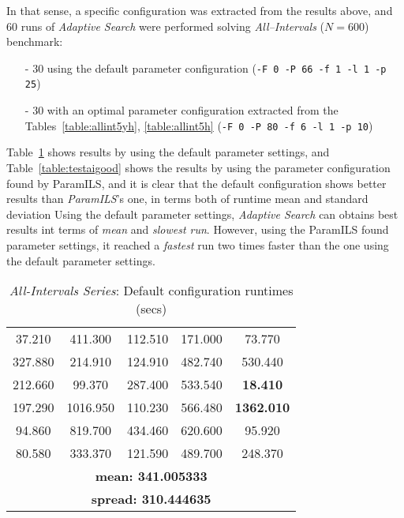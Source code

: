 In that sense, a specific configuration was extracted from the results above, and 60 runs of {\it Adaptive Search} were performed solving {\it All--Intervals} ($N = 600$) benchmark:
\begin{itemize}
	\item[-] 30 using the default parameter configuration (\texttt{-F 0 -P 66 -f 1 -l 1 -p 25})
	\item[-] 30 with an optimal parameter configuration extracted from the Tables~\ref{table:allint5yh}, \ref{table:allint5h} (\texttt{-F 0 -P 80 -f 6 -l 1 -p 10})
\end{itemize}

Table~\ref{table:testaibad} shows results by using the default parameter settings, and Table~\ref{table:testaigood} shows the results by using the parameter configuration found by {\sc ParamILS}, and it is clear that the default configuration shows better results than {\it ParamILS}'s one, in terms both of runtime mean and standard deviation Using the default parameter settings, {\it Adaptive Search} can obtains best results int terms of {\it mean} and {\it slowest run}. However, using the {\sc ParamILS} found parameter settings, it reached a {\it fastest} run two times faster than the one using the default parameter settings. 

\begin{table}[h]
\centering
\renewcommand{\arraystretch}{1.2}
\begin{tabular}{|ccccc|}
	\hline
	37.210 & 411.300 & 112.510 & 171.000 & 73.770 \\ 
	327.880 & 214.910 & 124.910 & 482.740 & 530.440 \\  
	\hline 
	212.660 & 99.370 & 287.400 & 533.540 & \textcolor{naranja}{\bf 18.410} \\ 
	197.290 & 1016.950 & 110.230 & 566.480 & \textcolor{intenso}{\bf 1362.010} \\  
	\hline 
	94.860 & 819.700 & 434.460 & 620.600 & 95.920 \\ 
	80.580 & 333.370 & 121.590 & 489.700 & 248.370 \\  
	\hline 
	\multicolumn{5}{|c|}{\bf mean: 341.005333}\\
	\multicolumn{5}{|c|}{\bf spread: 310.444635}\\
	\hline
\end{tabular}
\caption{{\it All-Intervals Series}: Default configuration runtimes (secs)}\label{table:testaibad}
\end{table}
	
